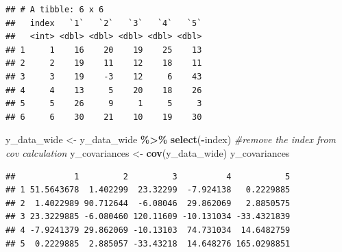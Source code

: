 \documentclass[
]{article}
\newenvironment{Shaded}{\begin{snugshade}}{\end{snugshade}}
\newcommand{\CommentTok}[1]{\textcolor[rgb]{0.56,0.35,0.01}{\textit{#1}}}
\newcommand{\FunctionTok}[1]{\textcolor[rgb]{0.13,0.29,0.53}{\textbf{#1}}}
\newcommand{\NormalTok}[1]{#1}
\newcommand{\OtherTok}[1]{\textcolor[rgb]{0.56,0.35,0.01}{#1}}
\newcommand{\SpecialCharTok}[1]{\textcolor[rgb]{0.81,0.36,0.00}{\textbf{#1}}}
\begin{document}
\begin{verbatim}
## # A tibble: 6 x 6
##   index   `1`   `2`   `3`   `4`   `5`
##   <int> <dbl> <dbl> <dbl> <dbl> <dbl>
## 1     1    16    20    19    25    13
## 2     2    19    11    12    18    11
## 3     3    19    -3    12     6    43
## 4     4    13     5    20    18    26
## 5     5    26     9     1     5     3
## 6     6    30    21    10    19    30
\end{verbatim}

\begin{Shaded}
\begin{Highlighting}[]
\NormalTok{y\_data\_wide }\OtherTok{\textless{}{-}}\NormalTok{ y\_data\_wide }\SpecialCharTok{\%\textgreater{}\%} \FunctionTok{select}\NormalTok{(}\SpecialCharTok{{-}}\NormalTok{index) }\CommentTok{\#remove the index from cov calculation}
\NormalTok{y\_covariances }\OtherTok{\textless{}{-}} \FunctionTok{cov}\NormalTok{(y\_data\_wide)}
\NormalTok{y\_covariances}
\end{Highlighting}
\end{Shaded}

\begin{verbatim}
##            1         2         3          4           5
## 1 51.5643678  1.402299  23.32299  -7.924138   0.2229885
## 2  1.4022989 90.712644  -6.08046  29.862069   2.8850575
## 3 23.3229885 -6.080460 120.11609 -10.131034 -33.4321839
## 4 -7.9241379 29.862069 -10.13103  74.731034  14.6482759
## 5  0.2229885  2.885057 -33.43218  14.648276 165.0298851
\end{verbatim}
\end{document}
